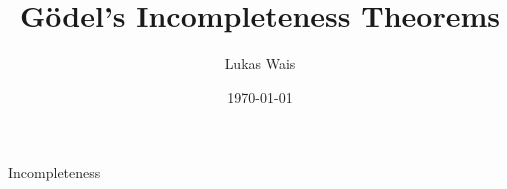 \documentclass[a4paper]{article}
\title{Gödel's Incompleteness Theorems}
\author{Lukas Wais}
\date{\today}
\begin{document}
	\maketitle
	{Incompleteness}
\end{document}
